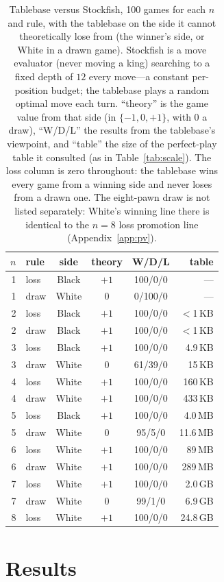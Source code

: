 \documentclass[Afour,sageapa,times]{sagej}
\theoremstyle{plain}
\theoremstyle{definition}
\newcommand{\sfSevenLoss}{100/0/0}
\newcommand{\sfSevenDraw}{99/1/0}
\newcommand{\sfEightLoss}{100/0/0}
\begin{document}
\begin{table}
\centering\small
\begin{tabular}{r l c c c r}
\toprule
$n$ & rule & side & theory & W/D/L & table\\
\midrule
1 & loss & Black & $+1$ & 100/0/0 & ---\\
1 & draw & White & $0$  & 0/100/0 & ---\\
2 & loss & Black & $+1$ & 100/0/0 & $<$1\,KB\\
2 & draw & Black & $+1$ & 100/0/0 & $<$1\,KB\\
3 & loss & Black & $+1$ & 100/0/0 & 4.9\,KB\\
3 & draw & White & $0$  & 61/39/0 & 15\,KB\\
4 & loss & White & $+1$ & 100/0/0 & 160\,KB\\
4 & draw & White & $+1$ & 100/0/0 & 433\,KB\\
5 & loss & Black & $+1$ & 100/0/0 & 4.0\,MB\\
5 & draw & White & $0$  & 95/5/0  & 11.6\,MB\\
6 & loss & White & $+1$ & 100/0/0 & 89\,MB\\
6 & draw & White & $+1$ & 100/0/0 & 289\,MB\\
7 & loss & White & $+1$ & \sfSevenLoss & 2.0\,GB\\
7 & draw & White & $0$  & \sfSevenDraw & 6.9\,GB\\
8 & loss & White & $+1$ & \sfEightLoss & 24.8\,GB\\
\bottomrule
\end{tabular}
\caption{Tablebase versus Stockfish, 100 games for each $n$ and rule, with the
tablebase on the side it cannot theoretically lose from (the winner's side, or
White in a drawn game). Stockfish is a move evaluator (never moving a king)
searching to a fixed depth of $12$ every move---a constant per-position budget;
the tablebase plays a random optimal move each turn. ``theory'' is the game value
from that side (in $\{-1,0,+1\}$, with $0$ a draw), ``W/D/L'' the results from the
tablebase's viewpoint, and
``table'' the size of the perfect-play table it consulted (as in
Table~\ref{tab:scale}). The loss column is zero throughout: the tablebase wins
every game from a winning side and never loses from a drawn one. The eight-pawn
draw is not listed separately: White's winning line there is identical to the
$n=8$ loss promotion line (Appendix~\ref{app:pv}).}
\label{tab:stockfish}
\end{table}

\section{Results}\label{sec:results}
\end{document}
